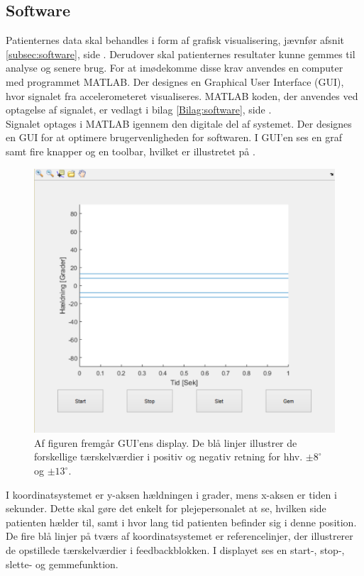 \subsection{Software}\label{software_test_implem}
Patienternes data skal behandles i form af grafisk visualisering, jævnfør afsnit \ref{subsec:software}, side \pageref{subsec:software}. Derudover skal patienternes resultater kunne gemmes til analyse og senere brug. For at imødekomme disse krav anvendes en computer med programmet MATLAB. Der designes en Graphical User Interface (GUI), hvor signalet fra accelerometeret visualiseres. MATLAB koden, der anvendes ved optagelse af signalet, er vedlagt i bilag \ref{Bilag:software}, side \pageref{Bilag:software}.\\ 
Signalet optages i MATLAB igennem den digitale del af systemet. Der designes en GUI for at optimere brugervenligheden for softwaren. I GUI'en ses en graf samt fire knapper og en toolbar, hvilket er illustretet på . 
\begin{figure}[H] 
	\centering 
	\includegraphics[scale=0.5]{figures/cProblemloesning/GUI_generisk.PNG}
	\caption{Af figuren fremgår GUI'ens display. De blå linjer illustrer de forskellige tærskelværdier i positiv og negativ retning for hhv. $\pm 8^{\circ}$ og $\pm 13^{\circ}$.}
	\label{Fig:GUI_generisk}
\end{figure} 
\noindent I koordinatsystemet er y-aksen hældningen i grader, mens x-aksen er tiden i sekunder. Dette skal gøre det enkelt for plejepersonalet at se, hvilken side patienten hælder til, samt i hvor lang tid patienten befinder sig i denne position. De fire blå linjer på tværs af koordinatsystemet er referencelinjer, der illustrerer de opstillede tærskelværdier i feedbackblokken. I displayet ses en start-, stop-, slette- og gemmefunktion.
